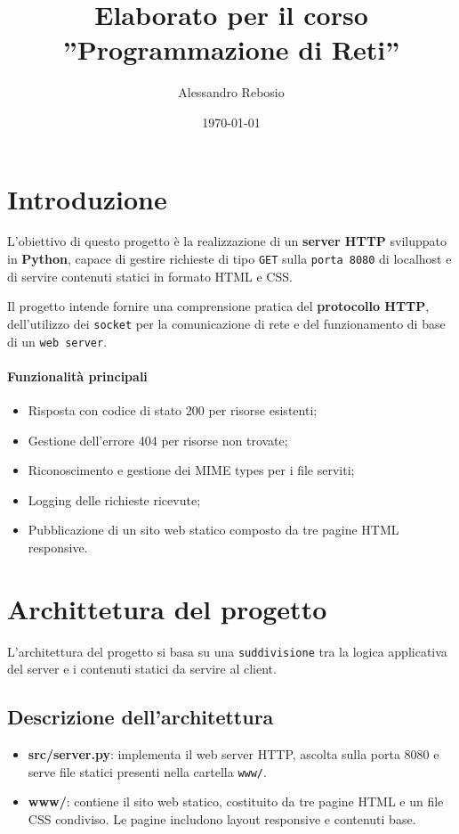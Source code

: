 \documentclass[a4paper,12pt]{report}
\title{Elaborato per il corso\\''Programmazione di Reti''}
\author{Alessandro Rebosio}
\date{\today}
\begin{document}
\maketitle

\tableofcontents

\chapter{Introduzione}

L'obiettivo di questo progetto è la realizzazione di un \textbf{server HTTP} \newline sviluppato in \textbf{Python},
capace di gestire richieste di tipo \texttt{GET} sulla \texttt{porta 8080} di localhost e di servire contenuti statici
in formato HTML e CSS.

\vspace{0.5cm}

\noindent Il progetto intende fornire una comprensione pratica del \textbf{protocollo \newline HTTP}, dell'utilizzo dei \texttt{socket}
per la comunicazione di rete e del funzionamento di base di un \texttt{web server}.

\subsubsection{Funzionalità principali}
\begin{itemize}
    \item Risposta con codice di stato 200 per risorse esistenti;
    \item Gestione dell'errore 404 per risorse non trovate;
    \item Riconoscimento e gestione dei MIME types per i file serviti;
    \item Logging delle richieste ricevute;
    \item Pubblicazione di un sito web statico composto da tre pagine HTML responsive.
\end{itemize}


\chapter{Archittetura del progetto}
L'architettura del progetto si basa su una \texttt{suddivisione} tra la logica \newline applicativa del server e i
contenuti statici da servire al client.

\section{Descrizione dell'architettura}
\begin{itemize}
    \item \textbf{src/server.py}: implementa il web server HTTP, ascolta sulla porta 8080 e serve file
          statici presenti nella cartella \texttt{www/}.
    \item \textbf{www/}: contiene il sito web statico, costituito da tre pagine HTML e un file CSS
          condiviso. Le pagine includono layout responsive e contenuti base.
\end{itemize}
\end{document}
